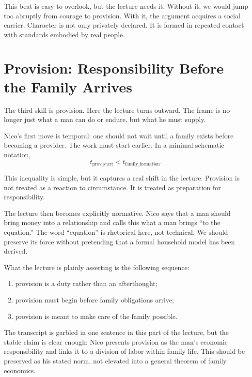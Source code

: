 This beat is easy to overlook, but the lecture needs it. Without it, we would jump too abruptly from courage to provision. With it, the argument acquires a social carrier. Character is not only privately declared. It is formed in repeated contact with standards embodied by real people.

\section{Provision: Responsibility Before the Family Arrives}

The third skill is provision. Here the lecture turns outward. The frame is no longer just what a man can do or endure, but what he must supply.

Nico's first move is temporal: one should not wait until a family exists before becoming a provider. The work must start earlier. In a minimal schematic notation,
\begin{equation}
t_{\mathrm{prov\_start}} < t_{\mathrm{family\_formation}}.
\end{equation}

This inequality is simple, but it captures a real shift in the lecture. Provision is not treated as a reaction to circumstance. It is treated as preparation for responsibility.

The lecture then becomes explicitly normative. Nico says that a man should bring money into a relationship and calls this what a man brings ``to the equation.'' The word ``equation'' is rhetorical here, not technical. We should preserve its force without pretending that a formal household model has been derived.

What the lecture is plainly asserting is the following sequence:
\begin{enumerate}
\item provision is a duty rather than an afterthought;
\item provision must begin before family obligations arrive;
\item provision is meant to make care of the family possible.
\end{enumerate}

\begin{remark}
The transcript is garbled in one sentence in this part of the lecture, but the stable claim is clear enough: Nico presents provision as the man's economic responsibility and links it to a division of labor within family life. This should be preserved as his stated norm, not elevated into a general theorem of family economics.
\end{remark}

